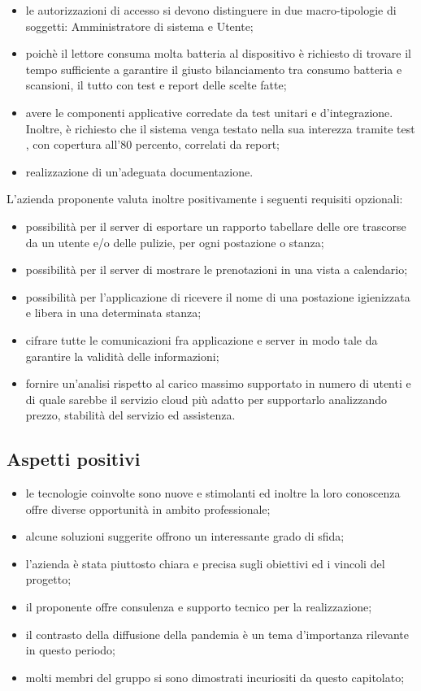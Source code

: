\begin{itemize}
\item le autorizzazioni di accesso si devono distinguere in due macro-tipologie di soggetti: Amministratore di sistema e Utente;
\item poichè il lettore  consuma molta batteria al dispositivo è richiesto di trovare il tempo sufficiente a garantire il giusto bilanciamento tra consumo batteria e scansioni, il tutto con test e report delle scelte fatte;
\item avere le componenti applicative corredate da test unitari e d’integrazione. Inoltre, è richiesto che il sistema venga testato nella sua interezza tramite test , con copertura all'80 percento, correlati da report;
\item realizzazione di un'adeguata documentazione.
\end{itemize}

L’azienda proponente valuta inoltre positivamente i seguenti requisiti opzionali:
\begin{itemize}    
\item possibilità per il server di esportare un rapporto tabellare delle ore trascorse da un utente e/o delle pulizie, per ogni postazione o stanza;
\item possibilità per il server di mostrare le prenotazioni in una vista a calendario;
\item possibilità per l'applicazione di ricevere il nome di una postazione igienizzata e libera in una determinata stanza; 
\item cifrare tutte le comunicazioni fra applicazione e server in modo tale da garantire la validità delle informazioni;
\item fornire un’analisi rispetto al carico massimo supportato in numero di utenti e di quale sarebbe il servizio cloud più adatto per supportarlo analizzando prezzo, stabilità  del servizio ed assistenza.
\end{itemize}

\subsection{Aspetti positivi}
\begin{itemize}
\item le tecnologie coinvolte sono nuove e stimolanti ed inoltre la loro conoscenza offre diverse opportunità in ambito professionale;
\item alcune soluzioni suggerite offrono un interessante grado di sfida;
\item l'azienda è stata piuttosto chiara e precisa sugli obiettivi ed i vincoli del progetto;
\item il proponente offre consulenza e supporto tecnico per la realizzazione;
\item il contrasto della diffusione della pandemia è un tema d'importanza rilevante in questo periodo;
\item molti membri del gruppo si sono dimostrati incuriositi da questo capitolato;

\end{itemize}

